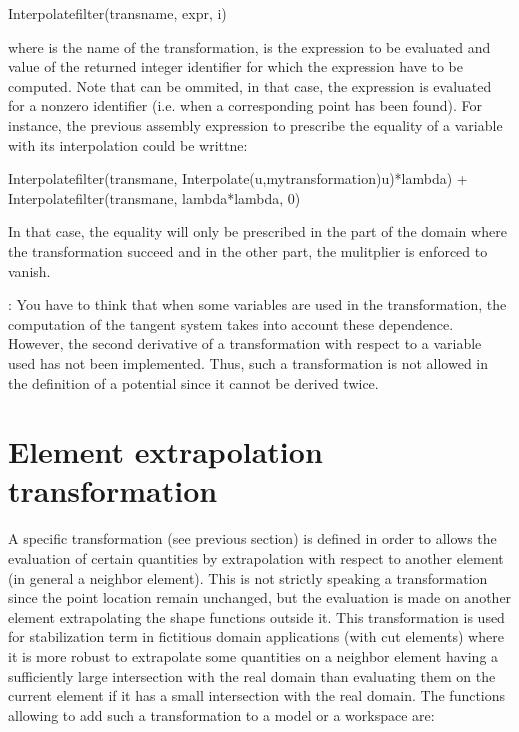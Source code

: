 \documentclass[a4paper,11pt,english]{sphinxmanual}
\begin{document}
\begin{sphinxVerbatim}[commandchars=\\\{\}]
Interpolate\PYGZus{}filter(transname, expr, i)
\end{sphinxVerbatim}

where  is the name of the transformation,  is the expression to be evaluated and  value of the returned integer identifier for which the expression have to be computed. Note that  can be ommited, in that case, the expression is evaluated for a nonzero identifier (i.e. when a corresponding point has been found). For instance, the previous assembly expression to prescribe the equality of a variable  with its interpolation could be writtne:

\begin{sphinxVerbatim}[commandchars=\\\{\}]
Interpolate\PYGZus{}filter(transmane, Interpolate(u,my\PYGZus{}transformation)\PYGZhy{}u)*lambda)
+ Interpolate\PYGZus{}filter(transmane, lambda*lambda, 0)
\end{sphinxVerbatim}

In that case, the equality will only be prescribed in the part of the domain where the transformation succeed and in the other part, the mulitplier is enforced to vanish.

: You have to think that when some variables are used in the transformation, the computation of the tangent system takes into account these dependence. However, the second derivative of a transformation with respect to a variable used has not been implemented. Thus, such a transformation is not allowed in the definition of a potential since it cannot be derived twice.


\section{Element extrapolation transformation}
\label{\detokenize{userdoc/gasm_high:element-extrapolation-transformation}}
A specific transformation (see previous section) is defined in order to allows the evaluation of certain quantities by extrapolation with respect to another element (in general a neighbor element). This is not strictly speaking a transformation since the point location remain unchanged, but the evaluation is made on another element extrapolating the shape functions outside it. This transformation is used for stabilization term in fictitious domain applications (with cut elements) where it is more robust to extrapolate some quantities on a neighbor element having a sufficiently large intersection with the real domain than evaluating them on the current element if it has a small intersection with the real domain. The functions allowing to add such a transformation to a model or a workspace are:
\end{document}
